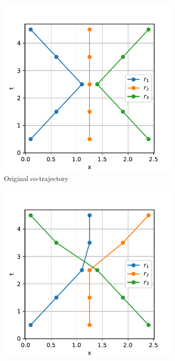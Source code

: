 \documentclass[12pt]{article}
\theoremstyle{definition}
\begin{document}
\begin{figure}
    \centering
    \begin{subfigure}[t]{0.3\textwidth}
      \includegraphics[width=\textwidth]{graph-swap-a.pdf}
      \caption{Original co-trajectory}
      \label{fig:graph-swap-a}
    \end{subfigure}
    \begin{subfigure}[t]{0.3\textwidth}
      \includegraphics[width=\textwidth]{graph-swap-b.pdf}

\end{subfigure}
\end{figure}
\end{document}
